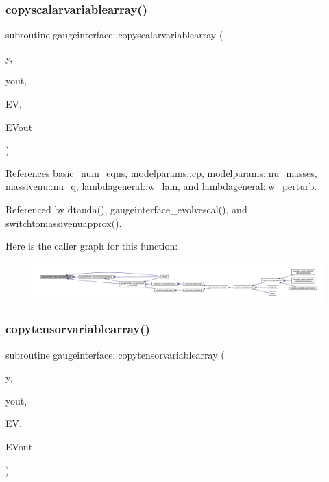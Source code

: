 \subsubsection{\texorpdfstring{copyscalarvariablearray()}{copyscalarvariablearray()}}
{\footnotesize\ttfamily subroutine gaugeinterface\+::copyscalarvariablearray (\begin{DoxyParamCaption}\item[{real(dl), dimension(ev\%nvar), intent(in)}]{y,  }\item[{real(dl), dimension(evout\%nvar), intent(out)}]{yout,  }\item[{type(\mbox{\hyperlink{structgaugeinterface_1_1evolutionvars}{evolutionvars}})}]{EV,  }\item[{type(\mbox{\hyperlink{structgaugeinterface_1_1evolutionvars}{evolutionvars}})}]{E\+Vout }\end{DoxyParamCaption})}



References basic\+\_\+num\+\_\+eqns, modelparams\+::cp, modelparams\+::nu\+\_\+masses, massivenu\+::nu\+\_\+q, lambdageneral\+::w\+\_\+lam, and lambdageneral\+::w\+\_\+perturb.



Referenced by dtauda(), gaugeinterface\+\_\+evolvescal(), and switchtomassivenuapprox().

Here is the caller graph for this function\+:
\nopagebreak
\begin{figure}[H]
\begin{center}
\leavevmode
\includegraphics[width=350pt]{namespacegaugeinterface_a8565dc876beb9e4339c005a72333f31f_icgraph}
\end{center}
\end{figure}
\mbox{\label{namespacegaugeinterface_ab306d2378bd6f559471a11afc145621c}} 
\subsubsection{\texorpdfstring{copytensorvariablearray()}{copytensorvariablearray()}}
{\footnotesize\ttfamily subroutine gaugeinterface\+::copytensorvariablearray (\begin{DoxyParamCaption}\item[{real(dl), dimension(ev\%nvart), intent(in)}]{y,  }\item[{real(dl), dimension(evout\%nvart), intent(out)}]{yout,  }\item[{type(\mbox{\hyperlink{structgaugeinterface_1_1evolutionvars}{evolutionvars}})}]{EV,  }\item[{type(\mbox{\hyperlink{structgaugeinterface_1_1evolutionvars}{evolutionvars}})}]{E\+Vout }\end{DoxyParamCaption})}



